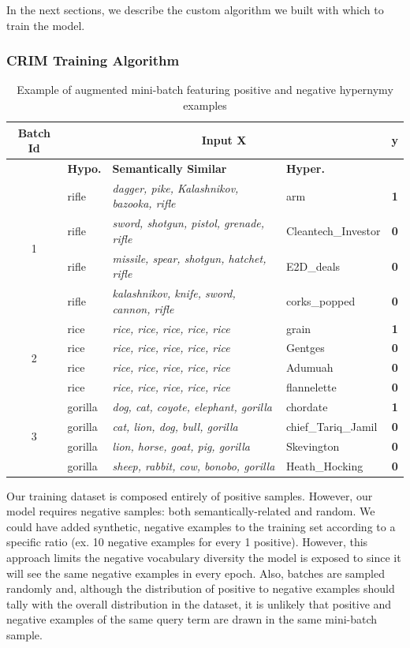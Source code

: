 In the next sections, we describe the custom algorithm we built with which to train the model.

\subsubsection{CRIM Training Algorithm} \label{crim_training}
\begin{table}\centering
    \begin{tabular}{@{}clllc@{}} \toprule
    \textbf{Batch Id} & \multicolumn{3}{c}{\textbf{Input X}} & \textbf{y} \\ \midrule
    & \textbf{Hypo.} & \textbf{Semantically Similar} & \textbf{Hyper.} &  \\ 
    \multirow{4}{*}{1} & rifle & \textit{dagger, pike, Kalashnikov, bazooka, rifle} & arm & \textbf{1}\\
    & rifle	& \textit{sword, shotgun, pistol, grenade, rifle} & Cleantech\_Investor & \textbf{0}\\
    & rifle & \textit{missile, spear, shotgun, hatchet, rifle} & E2D\_deals & \textbf{0}\\
    & rifle & \textit{kalashnikov, knife, sword, cannon, rifle} & corks\_popped & \textbf{0}\\ \midrule
    \multirow{4}{*}{2} & rice & \textit{rice, rice, rice, rice, rice} & grain & \textbf{1}\\
    & rice & \textit{rice, rice, rice, rice, rice} & Gentges & \textbf{0}\\
    & rice & \textit{rice, rice, rice, rice, rice} & Adumuah & \textbf{0}\\
    & rice & \textit{rice, rice, rice, rice, rice} & flannelette & \textbf{0}\\ \midrule
    \multirow{4}{*}{3} & gorilla & \textit{dog, cat, coyote, elephant, gorilla} & chordate & \textbf{1}\\
    & gorilla & \textit{cat, lion, dog, bull, gorilla} & chief\_Tariq\_Jamil & \textbf{0}\\
    & gorilla & \textit{lion, horse, goat, pig, gorilla} & Skevington & \textbf{0}\\
    & gorilla & \textit{sheep, rabbit, cow, bonobo, gorilla} & Heath\_Hocking & \textbf{0}\\
    \bottomrule
    \end{tabular}
    \caption{Example of augmented mini-batch featuring positive and negative hypernymy examples}\label{tab:mini_batch_example}
\end{table}
Our training dataset is composed entirely of positive samples.  However, our model requires negative samples: both semantically-related and random.  We could have added synthetic, negative examples to the training set according to a specific ratio (ex. 10 negative examples for every 1 positive).  However, this approach limits the negative vocabulary diversity the model is exposed to since it will see the same negative examples in every epoch.  Also, batches are sampled randomly and, although the distribution of positive to negative examples should tally with the overall distribution in the dataset, it is unlikely that positive and negative examples of the same query term are drawn in the same mini-batch sample. 

